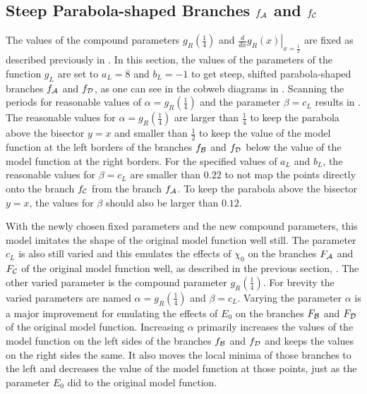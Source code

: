 \subsection{Steep Parabola-shaped Branches $f_{\mathcal{A}}$ and $f_{\mathcal{C}}$}
\label{sec:setup.quad.hyper.1}

The values of the compound parameters $g_R\left(\frac{1}{4}\right)$ and $\left. \frac{d}{dx} g_R\left(x\right) \right|_{x = \frac{1}{2}}$ are fixed as described previously in .
In this section, the values of the parameters of the function $g_L$ are set to $a_L = 8$ and $b_L = -1$ to get steep, shifted parabola-shaped branches $f_{\mathcal{A}}$ and $f_{\mathcal{D}}$, as one can see in the cobweb diagrams in .
Scanning the periods for reasonable values of $\alpha = g_R\left(\frac{1}{4}\right)$ and the parameter $\beta = c_L$ results in .
The reasonable values for $\alpha = g_R\left(\frac{1}{4}\right)$ are larger than $\frac{1}{4}$ to keep the parabola above the bisector $y = x$ and smaller than $\frac{1}{2}$ to keep the value of the model function at the left borders of the branches $f_{\mathcal{B}}$ and $f_{\mathcal{D}}$ below the value of the model function at the right borders.
For the specified values of $a_L$ and $b_L$, the reasonable values for $\beta = c_L$ are smaller than $0.22$ to not map the points directly onto the branch $f_{\mathcal{C}}$ from the branch $f_{\mathcal{A}}$.
To keep the parabola above the bisector $y = x$, the values for $\beta$ should also be larger than $0.12$.

With the newly chosen fixed parameters and the new compound parameters, this model imitates the shape of the original model function well still.
The parameter $c_L$ is also still varied and this emulates the effects of $\chi_0$ on the branches $F_{\mathcal{A}}$ and $F_{\mathcal{C}}$ of the original model function well, as described in the previous section, .
The other varied parameter is the compound parameter $g_R\left(\frac{1}{4}\right)$.
For brevity the varied parameters are named $\alpha = g_R\left(\frac{1}{4}\right)$ and $\beta = c_L$.
Varying the parameter $\alpha$ is a major improvement for emulating the effects of $E_0$ on the branches $F_{\mathcal{B}}$ and $F_{\mathcal{D}}$ of the original model function.
Increasing $\alpha$ primarily increases the values of the model function on the left sides of the branches $f_{\mathcal{B}}$ and $f_{\mathcal{D}}$ and keeps the values on the right sides the same.
It also moves the local minima of those branches to the left and decreases the value of the model function at those points, just as the parameter $E_0$ did to the original model function.

